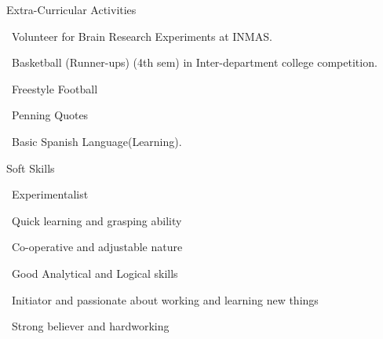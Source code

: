 \documentclass{resume} %
\begin{document}

\begin{rSection}{Extra-Curricular Activities} \itemsep -3pt
	\item \textbullet \ Volunteer for Brain Research Experiments at INMAS.
	\item \textbullet \ Basketball (Runner-ups) (4th sem) in Inter-department college competition.
	\item \textbullet \ Freestyle Football
	\item \textbullet \ Penning Quotes
	\item \textbullet \ Basic Spanish Language(Learning).
\end{rSection}

\begin{rSection}{Soft Skills}
  \itemsep -3pt
  \item \textbullet \ Experimentalist
 \item \textbullet \ Quick learning and grasping ability
  \item \textbullet \ Co-operative and adjustable nature
 \item \textbullet \ Good Analytical and Logical skills 
 \item \textbullet \ Initiator and passionate about working and learning new things 
 \item \textbullet \ Strong believer and hardworking
\end{rSection}
\end{document}
